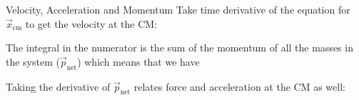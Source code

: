 \documentclass[12pt,compress,aspectratio=169]{beamer}
\begin{document}
\begin{frame}{Velocity, Acceleration and Momentum}
  Take time derivative of the equation for $\vec x_\text{cm}$ to get the
  velocity at the CM:
    
  
  The integral in the numerator is the sum of the momentum of all the masses in
  the system ($\vec p_\text{net}$) which means that we have


  Taking the derivative of $\vec p_\text{net}$ relates force and acceleration
  at the CM as well:
    
\end{frame}


\end{document}
